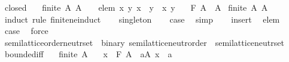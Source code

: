 \begin{isabellebody}
\ closed{\isacharcolon}{\kern0pt}\isanewline
\ \ \ {\isachardoublequoteopen}finite\ A{\isachardoublequoteclose}\ {\isachardoublequoteopen}A\ {\isasymnoteq}\ {\isacharbraceleft}{\kern0pt}{\isacharbraceright}{\kern0pt}{\isachardoublequoteclose}\ \ elem{\isacharcolon}{\kern0pt}\ {\isachardoublequoteopen}{\isasymAnd}x\ y{\isachardot}{\kern0pt}\ x\ \isactrlbold {\isacharasterisk}{\kern0pt}\ y\ {\isasymin}\ {\isacharbraceleft}{\kern0pt}x{\isacharcomma}{\kern0pt}\ y{\isacharbraceright}{\kern0pt}{\isachardoublequoteclose}\isanewline
\ \ \ {\isachardoublequoteopen}F\ A\ {\isasymin}\ A{\isachardoublequoteclose}\isanewline
%
\isadelimproof
%
\endisadelimproof
%
\isatagproof
{}\isamarkupfalse%
\ {\isacartoucheopen}finite\ A{\isacartoucheclose}\ {\isacartoucheopen}A\ {\isasymnoteq}\ {\isacharbraceleft}{\kern0pt}{\isacharbraceright}{\kern0pt}{\isacartoucheclose}\ \isamarkupfalse%
\ {\isacharparenleft}{\kern0pt}induct\ rule{\isacharcolon}{\kern0pt}\ finite{\isacharunderscore}{\kern0pt}ne{\isacharunderscore}{\kern0pt}induct{\isacharparenright}{\kern0pt}\isanewline
\ \ \isamarkupfalse%
\ singleton\ \isamarkupfalse%
\ \isamarkupfalse%
\ {\isacharquery}{\kern0pt}case\ \isamarkupfalse%
\ simp\isanewline
{}\isamarkupfalse%
\isanewline
\ \ \isamarkupfalse%
\ insert\ \isamarkupfalse%
\ elem\ \isamarkupfalse%
\ {\isacharquery}{\kern0pt}case\ \isamarkupfalse%
\ force\isanewline
{}\isamarkupfalse%
%
\endisatagproof
{\isafoldproof}%
%
\isadelimproof
\isanewline
%
\endisadelimproof
\isanewline
{}\isamarkupfalse%
\isanewline
\isanewline
{}\isamarkupfalse%
\ semilattice{\isacharunderscore}{\kern0pt}order{\isacharunderscore}{\kern0pt}neutr{\isacharunderscore}{\kern0pt}set\ {\isacharequal}{\kern0pt}\ binary{\isacharquery}{\kern0pt}{\isacharcolon}{\kern0pt}\ semilattice{\isacharunderscore}{\kern0pt}neutr{\isacharunderscore}{\kern0pt}order\ {\isacharplus}{\kern0pt}\ semilattice{\isacharunderscore}{\kern0pt}neutr{\isacharunderscore}{\kern0pt}set\isanewline
{}\isanewline
\isanewline
{}\isamarkupfalse%
\ bounded{\isacharunderscore}{\kern0pt}iff{\isacharcolon}{\kern0pt}\isanewline
\ \ \ {\isachardoublequoteopen}finite\ A{\isachardoublequoteclose}\isanewline
\ \ \ {\isachardoublequoteopen}x\ \isactrlbold {\isasymle}\ F\ A\ {\isasymlongleftrightarrow}\ {\isacharparenleft}{\kern0pt}{\isasymforall}a{\isasymin}A{\isachardot}{\kern0pt}\ x\ \isactrlbold {\isasymle}\ a{\isacharparenright}{\kern0pt}{\isachardoublequoteclose}\isanewline

\end{isabellebody}
